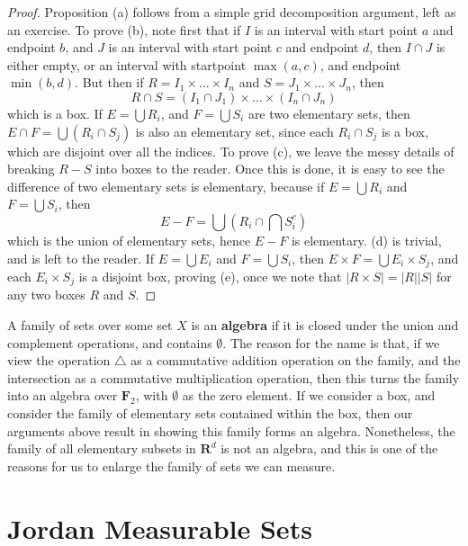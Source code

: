\begin{proof}
  Proposition (a) follows from a simple grid decomposition argument, left as an exercise. To prove (b), note first that if $I$ is an interval with start point $a$ and endpoint $b$, and $J$ is an interval with start point $c$ and endpoint $d$, then $I \cap J$ is either empty, or an interval with startpoint $\max(a,c)$, and endpoint $\min(b,d)$. But then if $R = I_1 \times \dots \times I_n$ and $S = J_1 \times \dots \times J_n$, then
    \[ R \cap S = (I_1 \cap J_1) \times \dots \times (I_n \cap J_n) \]
    which is a box. If $E = \bigcup R_i$, and $F = \bigcup S_i$ are two elementary sets, then $E \cap F = \bigcup (R_i \cap S_j)$ is also an elementary set, since each $R_i \cap S_j$ is a box, which are disjoint over all the indices. To prove (c), we leave the messy details of breaking $R - S$ into boxes to the reader. Once this is done, it is easy to see the difference of two elementary sets is elementary, because if $E = \bigcup R_i$ and $F = \bigcup S_i$, then
    \[ E - F = \bigcup (R_i \cap \bigcap S_i^c) \]
    which is the union of elementary sets, hence $E - F$ is elementary. (d) is trivial, and is left to the reader. If $E = \bigcup E_i$ and $F = \bigcup S_i$, then $E \times F = \bigcup E_i \times S_j$, and each $E_i \times S_j$ is a disjoint box, proving (e), once we note that $|R \times S| = |R||S|$ for any two boxes $R$ and $S$.
\end{proof}

A family of sets over some set $X$ is an {\bf algebra} if it is closed under the union and complement operations, and contains $\emptyset$. The reason for the name is that, if we view the operation $\bigtriangleup$ as a commutative addition operation on the family, and the intersection as a commutative multiplication operation, then this turns the family into an algebra over $\mathbf{F}_2$, with $\emptyset$ as the zero element. If we consider a box, and consider the family of elementary sets contained within the box, then our arguments above result in showing this family forms an algebra. Nonetheless, the family of all elementary subsets in $\mathbf{R}^d$ is not an algebra, and this is one of the reasons for us to enlarge the family of sets we can measure.

\section{Jordan Measurable Sets}

